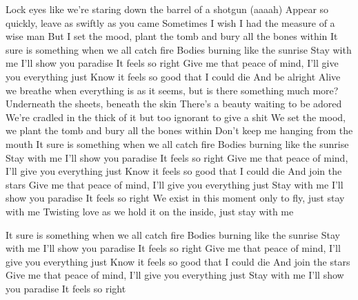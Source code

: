 
\beginverse
Lock eyes like we're staring down the barrel of a 
shotgun (aaaah)
Appear so quickly, leave as 
swiftly as you came
Sometimes I wish I had the measure of a wise man
But I set the mood, plant the tomb and 
bury all the bones within
\endverse
\beginverse*
It sure is something when we all catch fire
Bodies burning like the sunrise
\endverse
\beginchorus
Stay with me I'll show you paradise
It feels so right
Give me that peace of mind, I'll give you 
everything just
Know it feels so good that I could die
And be alright
\endchorus
\beginverse
Alive we breathe when 
everything is as it seems, but is there 
something much more?
Underneath the sheets, beneath the skin
There's a beauty waiting to be adored
\endverse
\beginverse*
We're cradled in the thick of it 
but too ignorant to give a shit
We set the mood, we plant the tomb
and bury all the bones within
Don't keep me hanging from the mouth
\endverse
\beginverse*
It sure is something when we all catch fire
Bodies burning like the sunrise
\endverse
\beginchorus
Stay with me I'll show you paradise
It feels so right
Give me that peace of mind, I'll give you 
everything just
Know it feels so good that I could die
And join the stars
Give me that peace of mind, I'll give you 
everything just
Stay with me
I'll show you paradise
It feels so right
\endchorus
\beginverse*
We exist in this moment only to 
fly, just stay with me
Twisting love as we hold it on the 
inside, just stay with me

It sure is something when we all catch fire
Bodies burning like the sunrise
\endverse*
\beginchorus
Stay with me I'll show you paradise
It feels so right
Give me that peace of mind, I'll give you 
everything just
Know it feels so good that I could die
And join the stars
Give me that peace of mind, I'll give you 
everything just
Stay with me
I'll show you paradise
It feels so right
\endchorus
\endsong

